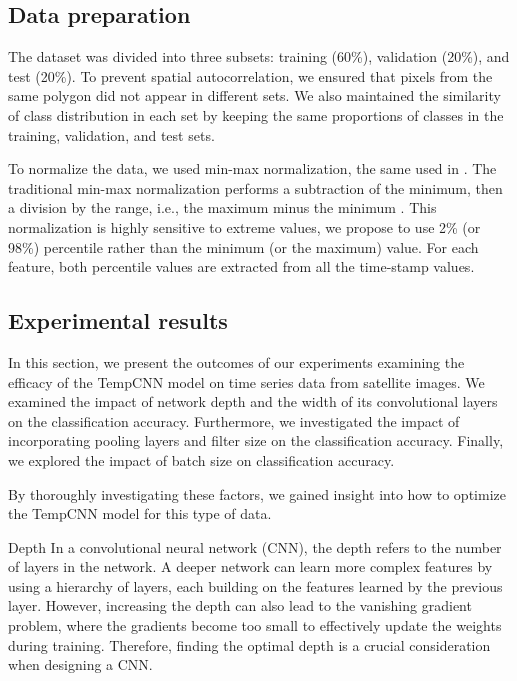 \subsection{Data preparation}
\label{sec:tempCNNDataPreparation}

The dataset was divided into three subsets: training (60\%), validation (20\%), and test (20\%).
To prevent spatial autocorrelation, we ensured that pixels from the same polygon did not appear in different sets.
We also maintained the similarity of class distribution in each set by keeping the same proportions of classes in the training, validation, and test sets.

To normalize the data, we used min-max normalization, the same used in \cite{tempCNN}.
The traditional min-max normalization performs a subtraction of the minimum, then a division by the range, i.e., the maximum minus the minimum \cite{han2011data}.
This normalization is highly sensitive to extreme values, we propose to use 2\% (or 98\%) percentile rather than the minimum (or the maximum) value. 
For each feature, both percentile values are extracted from all the time-stamp values.

\subsection{Experimental results}

In this section, we present the outcomes of our experiments examining the efficacy of the TempCNN model on time series data from satellite images.
We examined the impact of network depth and the width of its convolutional layers on the classification accuracy. 
Furthermore, we investigated the impact of incorporating pooling layers and filter size on the classification accuracy. 
Finally, we explored the impact of batch size on classification accuracy. 

By thoroughly investigating these factors, we gained insight into how to optimize the TempCNN model for this type of data.


\begin{paragraph}{Depth}
In a convolutional neural network (CNN), the depth refers to the number of layers in the network.
A deeper network can learn more complex features by using a hierarchy of layers, each building on the features learned by the previous layer.
However, increasing the depth can also lead to the vanishing gradient problem, where the gradients become too small to effectively update the weights during training.
Therefore, finding the optimal depth is a crucial consideration when designing a CNN.
\end{paragraph}

